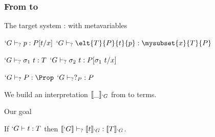 \begin{frame}
  \frametitle{From \Russell{} to \Coq}
  
  \begin{block}{The target system : \CIC{} with metavariables}
    \begin{center}
      {$`G \vdash_{?} p : P[t/x]$}
      {$`G \typec \elt{T}{P}{t}{p} : \mysubset{x}{T}{P}$}
      {}\DP
      
      \vspace{0.25cm}
      {$`G \vdash_{?} \sigma_1~t : T$}
      {}
      \DP
      \quad
      {$`G \vdash_{?} \sigma_2~t : P[\sigma_1~t/x]$}
      {}
      \DP

      \vspace{0.25cm}
      \UAX{}
      {$`G \typec P : \Prop$}
      {$`G \vdash_{?} ?_{P} : P$}
      {}\DP
    \end{center}
  \end{block}

  We build an interpretation $\llbracket \_ \rrbracket_{`G}$ from \Russell to \CICq
  terms.
  \pause  
  \begin{block}{Our goal}
    \begin{center}
      If $`G \vdash t : T$ then $\llbracket `G \rrbracket \vdash_{?} \llbracket t \rrbracket_{`G} : \llbracket T \rrbracket_{`G}$.
    \end{center}
  \end{block}
\end{frame}

